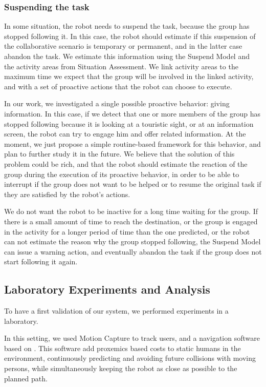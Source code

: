 \subsubsection{Suspending the task}
In some situation, the robot needs to suspend the task, because the group has stopped following it. In this case, the robot should estimate if this suspension of the collaborative scenario is temporary or permanent, and in the latter case abandon the task. We estimate this information using the Suspend Model and the activity areas from Situation Assessment. We link activity areas to the maximum time we expect that the group will be involved in the linked activity, and with a set of proactive actions that the robot can choose to execute.

In our work, we investigated a single possible proactive behavior: giving information. In this case, if we detect that one or more  members
of the group has stopped following because it is looking at a touristic sight, or at an information screen, the robot can try to engage him and offer related information. At the moment, we just propose a simple routine-based framework for this behavior, and plan to further study it in the future. We believe that the solution of this problem could be rich, and that the robot should estimate the reaction of the group during the execution of its proactive behavior, in order to be able to interrupt if the group does not want to be helped or to resume the original task if they are satisfied by the robot's actions.

We do not want the robot to be inactive for a long time  waiting for the group. If there is a small amount of time to reach the destination, or the group is engaged in the activity for a longer period of time than the one predicted, or the robot can not estimate the reason why the group stopped following, the Suspend Model can issue a warning action, and eventually abandon the task if the group does not start following it again.



\subsection{Laboratory Experiments and Analysis}
\label{subsec:case_study-spencer-lab_experiments}

To have a first validation of our system, we performed experiments in a laboratory.

In this setting, we used Motion Capture to track users, and a navigation software based on \cite{sisbotTRO2007,kruse12crossing}. This software add proxemics based costs to static humans in the environment, continuously predicting and avoiding future collisions with moving persons, while  simultaneously keeping the robot as close as possible to the planned path.

